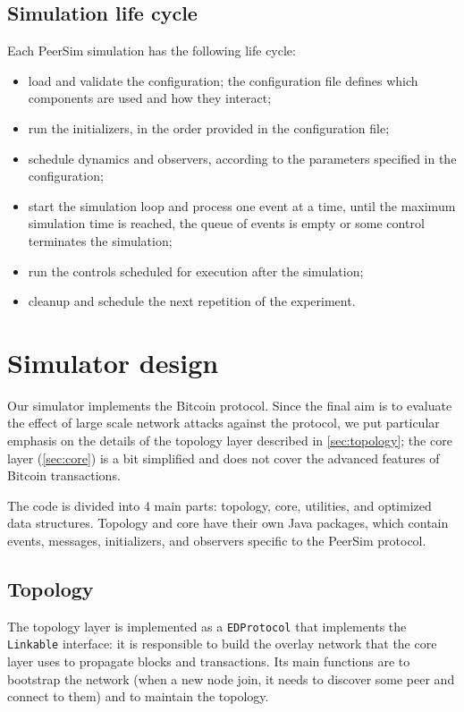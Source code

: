 \subsection{Simulation life cycle}
Each PeerSim simulation has the following life cycle:
\begin{itemize}
	\item load and validate the configuration; the configuration file defines which components are used and how they interact;
	\item run the initializers, in the order provided in the configuration file;
	\item schedule dynamics and observers, according to the parameters specified in the configuration;
	\item start the simulation loop and process one event at a time, until the maximum simulation time is reached, the queue of events is empty or some control terminates the simulation;
	\item run the controls scheduled for execution after the simulation;
	\item cleanup and schedule the next repetition of the experiment.
\end{itemize}


\section{Simulator design}
Our simulator implements the Bitcoin protocol.
Since the final aim is to evaluate the effect of large scale network attacks against the protocol, we put particular emphasis on the details of the topology layer described in \cref{sec:topology};
the core layer (\cref{sec:core}) is a bit simplified and does not cover the advanced features of Bitcoin transactions.

\smallskip
The code is divided into \num{4} main parts: topology, core, utilities, and optimized data structures.
Topology and core have their own Java packages, which contain events, messages, initializers, and observers specific to the PeerSim protocol.

\subsection{Topology}
The topology layer is implemented as a \texttt{EDProtocol} that implements the \texttt{Linkable} interface:
it is responsible to build the overlay network that the core layer uses to propagate blocks and transactions.
Its main functions are to bootstrap the network (when a new node join, it needs to discover some peer and connect to them) and to maintain the topology.


